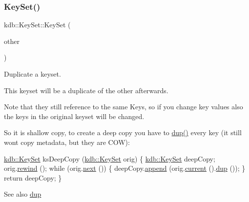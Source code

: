 \subsubsection{\texorpdfstring{Key\+Set()}{KeySet()}\hspace{0.1cm}{\footnotesize\ttfamily [3/5]}}
{\footnotesize\ttfamily kdb\+::\+Key\+Set\+::\+Key\+Set (\begin{DoxyParamCaption}\item[{const \hyperlink{classkdb_1_1KeySet}{Key\+Set} \&}]{other }\end{DoxyParamCaption})\hspace{0.3cm}{\ttfamily [inline]}}



Duplicate a keyset. 

This keyset will be a duplicate of the other afterwards.

\begin{DoxyNote}{Note}
that they still reference to the same Keys, so if you change key values also the keys in the original keyset will be changed.
\end{DoxyNote}
So it is shallow copy, to create a deep copy you have to \hyperlink{classkdb_1_1KeySet_ad3f2b936d66729690e8a8a45b5074baa}{dup()} every key (it still won\textquotesingle{}t copy metadata, but they are C\+OW)\+: 
\begin{DoxyCodeInclude}
\hyperlink{classkdb_1_1KeySet}{kdb::KeySet} ksDeepCopy (\hyperlink{classkdb_1_1KeySet}{kdb::KeySet} orig)
\{
        \hyperlink{classkdb_1_1KeySet}{kdb::KeySet} deepCopy;
        orig.\hyperlink{classkdb_1_1KeySet_a5bc5a16a726e959adaf3cf8506e7b849}{rewind} ();
        \textcolor{keywordflow}{while} (orig.\hyperlink{classkdb_1_1KeySet_affd52d130faf184361297f9e7f0c9f16}{next} ())
        \{
                deepCopy.\hyperlink{classkdb_1_1KeySet_a0d4b2f3aa9f58d10053561135b50233e}{append} (orig.\hyperlink{classkdb_1_1KeySet_a0a0fc4efecd6dcbfde5fc35301b60349}{current} ().\hyperlink{classkdb_1_1Key_ababb1ccd9f18db379eb4a62f8db87bf5}{dup} ());
        \}
        \textcolor{keywordflow}{return} deepCopy;
\}
\end{DoxyCodeInclude}
 \begin{DoxySeeAlso}{See also}
\hyperlink{classkdb_1_1KeySet_ad3f2b936d66729690e8a8a45b5074baa}{dup} 
\end{DoxySeeAlso}
\mbox{\label{classkdb_1_1KeySet_a6191e93cdd67bbca63df934498d191ba}} 
